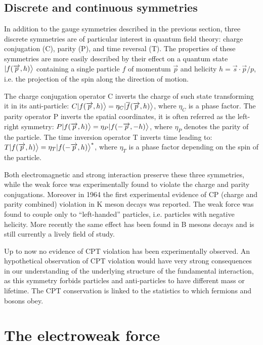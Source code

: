 \subsection{Discrete and continuous symmetries}

In addition to the gauge symmetries described in the previous section, three discrete symmetries are of particular interest in quantum field theory: charge conjugation (C), parity (P), and time reversal (T). The properties of these symmetries are more easily described by their effect on a quantum state $|f(\overrightarrow{p}, h)\big{>}$ containing a single particle $f$ of momentum $\vec{p}$ and helicity $h = \vec{s} \cdot \vec{p} / p$, i.e. the projection of the spin along the direction of motion.

The charge conjugation operator C inverts the charge of such state transforming it in its anti-particle: $C|f(\overrightarrow{p}, h)\big{>} = \eta_C|\overline{f}(\overrightarrow{p}, h)\big{>}$, where $\eta_C$ is a phase factor. The parity operator P inverts the spatial coordinates, it is often referred as the left-right symmetry: $P|f(\overrightarrow{p}, h)\big{>} = \eta_P|f(-\overrightarrow{p}, -h)\big{>}$, where $\eta_P$ denotes the parity of the particle. The time inversion operator T inverts time leading to: $T|f(\overrightarrow{p}, h)\big{>} = \eta_T|f(-\overrightarrow{p}, h)\big{>}^*$, where $\eta_T$ is a phase factor depending on the spin of the particle.

Both electromagnetic and strong interaction preserve these three symmetries, while the weak force was experimentally found to violate the charge and parity conjugations. Moreover in 1964 the first experimental evidence of CP (charge and parity combined) violation in K meson decays \cite{PhysRevLett.13.138} was reported. The weak force was found to couple only to ``left-handed'' particles, i.e. particles with negative helicity. More recently the same effect has been found in B mesons decays and is still currently a lively field of study. 

Up to now no evidence of CPT violation has been experimentally observed. An hypothetical observation of CPT violation would have very strong consequences in our understanding of the underlying structure of the fundamental interaction, as this symmetry forbids particles and anti-particles to have different mass or lifetime. The CPT conservation is linked to the statistics to which fermions and bosons obey.

\section{The electroweak force}

